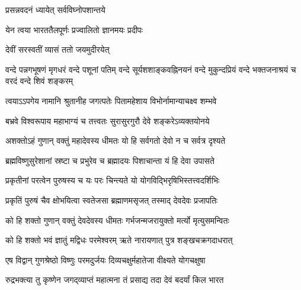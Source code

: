 \label{sec:start_ShivaSahasranamaStotram}

{प्रसन्नवदनं ध्यायेत् सर्वविघ्नोपशान्तये}

{येन त्वया भारततैलपूर्णः प्रज्वालितो ज्ञानमयः प्रदीपः}


{देवीं सरस्वतीं व्यासं ततो जयमुदीरयेत्}


{वन्दे पन्नगभूषणं मृगधरं वन्दे पशूनां पतिम्}
{वन्दे सूर्यशशाङ्कवह्निनयनं वन्दे मुकुन्दप्रियं}
{वन्दे भक्तजनाश्रयं च वरदं वन्दे शिवं शङ्करम्}


\twolineshloka
{त्वयाऽऽपगेय नामानि श्रुतानीह जगत्पतेः}
{पितामहेशाय विभोर्नामान्याचक्ष्व शम्भवे}%

\twolineshloka
{बभ्रवे विश्वरूपाय महाभाग्यं च तत्त्वतः}
{सुरासुरगुरौ देवे शङ्करेऽव्यक्तयोनये}%

\twolineshloka
{अशक्तोऽहं गुणान् वक्तुं महादेवस्य धीमतः}
{यो हि सर्वगतो देवो न च सर्वत्र दृश्यते}%

\twolineshloka
{ब्रह्मविष्णुसुरेशानां स्रष्टा च प्रभुरेव च}
{ब्रह्मादयः पिशाचान्ता यं हि देवा उपासते}%

\twolineshloka
{प्रकृतीनां परत्वेन पुरुषस्य च यः परः}
{चिन्त्यते यो योगविद्भिरृषिभिस्तत्त्वदर्शिभिः}%

\twolineshloka
{प्रकृतिं पुरुषं चैव क्षोभयित्वा स्वतेजसा}
{ब्रह्माणमसृजत् तस्माद् देवदेवः प्रजापतिः}%


\twolineshloka
{को हि शक्तो गुणान् वक्तुं देवदेवस्य धीमतः}
{गर्भजन्मजरायुक्तो मर्त्यो मृत्युसमन्वितः}%

\twolineshloka
{को हि शक्तो भवं ज्ञातुं मद्विधः परमेश्वरम्}
{ऋते नारायणात् पुत्र शङ्खचक्रगदाधरात्}%

\twolineshloka
{एष विद्वान् गुणश्रेष्ठो विष्णुः परमदुर्जयः}
{दिव्यचक्षुर्महातेजा वीक्ष्यते योगचक्षुषा}%

\twolineshloka
{रुद्रभक्त्या तु कृष्णेन जगद्‌व्याप्तं महात्मना}
{तं प्रसाद्य तदा देवं बदर्यां किल भारत}%

